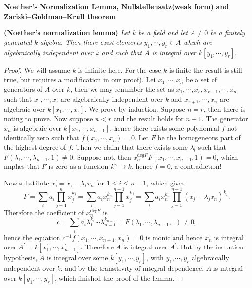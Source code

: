 \begin{center}
\textbf{Noether's Normalization Lemma, Nullstellensatz(weak form) and Zariski–Goldman–Krull theorem}
\end{center}
\begin{problem}{\textbf{(Noether's normalization lemma)}}\em
Let $k$ be a field and let $A\ne 0$ be a finitely generated $k$-algebra. Then there exist elements $y_1,\cdots,y_r\in A$ which are algebraically independent over $k$ and such that $A$ is integral over $k[y_1,\cdots,y_r]$.
\end{problem}
\begin{proof}
We will assume $k$ is infinite here. For the case $k$ is finite the result is still true, but requires a modification in our proof). Let $x_1,\cdots,x_n$ be a set of generators of $A$ over $k$, then we may renumber the set as $x_1,\cdots,x_r,x_{r+1},\cdots,x_n$ such that $x_1,\cdots,x_r$ are algebraically independent over $k$ and $x_{r+1},\cdots,x_n$ are algebraic over $k[x_1,\cdots,x_r]$. We prove by induction. Suppose $n=r$, then there is noting to prove. Now suppose $n<r$ and the result holds for $n-1$. The generator $x_n$ is algebraic over $k[x_1,\cdots,x_{n-1}]$, hence there exists some polynomial $f$ not identically zero such that $f(x_1,\cdots,x_n)=0$. Let $F$ be the homogeneous part of the highest degree of $f$. Then we claim that there exists some $\lambda_i$ such that $F(\lambda_1,\cdots,\lambda_{n-1},1)\ne 0$. Suppose not, then $x_{n}^{\mathrm{deg}F}F\left( x_1,\cdots ,x_{n-1},1 \right) =0$, which implies that $F$ is zero as a function $k^n\to k$, hence $f=0$, a contradiction!\par
Now substitute $x_i^\prime=x_i-\lambda_ix_n$ for $1\le i\le n-1$, which gives
$$
F=\sum_i{a_i\prod_{j=1}^n{x_{j}^{k_j}}}=\sum_i{a_ix_{n}^{k_n}\prod_{j=1}^{n-1}{x_{j}^{k_j}}}=\sum_i{a_ix_{n}^{k_n}\prod_{j=1}^{n-1}{\left( x_{j}^{\prime}-\lambda _jx_n \right) ^{k_j}}}.
$$
Therefore the coefficient of $x_n^{\mathrm{deg}F}$ is 
$$
c=\sum_i{a_i\lambda _{1}^{k_1}\cdots \lambda _{n-1}^{k_{n-1}}}=F\left( \lambda _1,\cdots ,\lambda _{n-1},1 \right) \ne 0,
$$
hence the equation $c^{-1}f(x_1,\cdots,x_{n-1},x_n)=0$ is monic and hence $x_n$ is integral over $A^\prime=k[x_1^\prime,\cdots,x_{n-1}^\prime]$. Therefore $A$ is integral over $A^\prime$.  But by the induction hypothesis, $A$ is integral over some $k[y_1,\cdots,y_r]$, with $y_1,\cdots,y_r$ algebraically independent over $k$, and by the transitivity  of integral dependence, $A$ is integral over $k[y_1,\cdots,y_r]$, which finished the proof of the lemma.
\end{proof}
